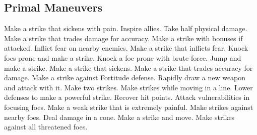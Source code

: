 \subsection{Primal Maneuvers}\label{Primal Maneuvers}
\begin{spelllist}
 Make a strike that sickens with pain.
 Inspire allies.
 Take half physical damage.
 Make a strike that trades damage for accuracy.
 Make a strike with bonuses if attacked.
 Inflict fear on nearby enemies.
 Make a strike that inflicts fear.
 Knock foes prone and make a strike.
 Knock a foe prone with brute force.
 Jump and make a strike.
 Make a strike that sickens.
 Make a strike that trades accuracy for damage.
 Make a strike against Fortitude defense.
 Rapidly draw a new weapon and attack with it.
 Make two strikes.
 Make strikes while moving in a line.
 Lower defenses to make a powerful strike.
 Recover hit points.
 Attack vulnerabilities in focusing foes.
 Make a weak strike that is extremely painful.
 Make strikes against nearby foes.
 Deal damage in a cone.
 Make a strike and move.
 Make strikes against all threatened foes.
\end{spelllist}



\small
